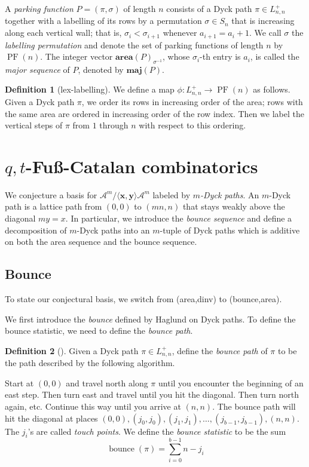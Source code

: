 \documentclass[12pt,reqno]{amsart}
\theoremstyle{definition}
\newtheorem{definition}{Definition}
\newcommand{\x}{\mathbf x}
\newcommand{\y}{\mathbf y}
\newcommand{\aarea}{\mathbf{area}}
\newcommand{\maj}{\mathbf{maj}}
\DeclareMathOperator{\PF}{PF}
\DeclareMathOperator{\bounce}{bounce}
\begin{document}
A \emph{parking function} $P = (\pi, \sigma)$ of length $n$ consists of a Dyck path $\pi \in L_{n,n}^+$ together with a labelling of its rows by a permutation $\sigma \in S_n$ that is increasing along each vertical wall; that is, $\sigma_i < \sigma_{i+1}$ whenever $a_{i+1} = a_i + 1$. We call $\sigma$ the \emph{labelling permutation} and denote the set of parking functions of length $n$ by $\PF(n)$. The integer vector $\aarea(P)_{\sigma^{-1}}$, whose $\sigma_i$-th entry is $a_i$, is called the \emph{major sequence} of $P$, denoted by $\maj(P)$.

\begin{definition}[lex-labelling]\label{def:incrow}
We define a map $\phi: L_{n,n}^+ \to \PF(n)$ as follows. Given a Dyck path $\pi$, we order its rows in increasing order of the area; rows with the same area are ordered in increasing order of the row index. Then we label the vertical steps of $\pi$ from $1$ through $n$ with respect to this ordering.
\end{definition}

\section{$q,t$-Fu\ss-Catalan combinatorics}\label{sec:fuss}
We conjecture a basis for $\mathcal{A}^m/\langle\x,\y\rangle\mathcal{A}^m$ labeled by \emph{$m$-Dyck paths}.
An $m$-Dyck path is a lattice path from $(0,0)$ to $(mn,n)$ that stays weakly above the diagonal $my = x$.
In particular, we introduce the \emph{bounce sequence} and define a decomposition of $m$-Dyck paths into an $m$-tuple of Dyck paths which is additive on both the area sequence and the bounce sequence.

\subsection{Bounce}
To state our conjectural basis, we switch from (area,dinv) to (bounce,area).

We first introduce the \emph{bounce} defined by Haglund on Dyck paths. To define the bounce statistic, we need to define the \emph{bounce path}.

\begin{definition}[\cite{MR2371044}]
    Given a Dyck path $\pi \in L_{n,n}^+$, define the \emph{bounce path} of $\pi$ to be the path described by the following algorithm.

    Start at $(0,0)$ and travel north along $\pi$ until you encounter the beginning of an east step. Then turn east and travel until you hit the diagonal. Then turn north again, etc. Continue this way until you arrive at $(n,n)$.
    The bounce path will hit the diagonal at places $(0,0),(j_0,j_0),(j_1,j_1),\dots,(j_{b-1},j_{b-1}),(n,n)$. The $j_i$'s are called \emph{touch points}.
    We define the \emph{bounce statistic} to be the sum
    \[
    \bounce(\pi) = \sum_{i=0}^{b-1} n-j_i
    \]
\end{definition}
\end{document}
